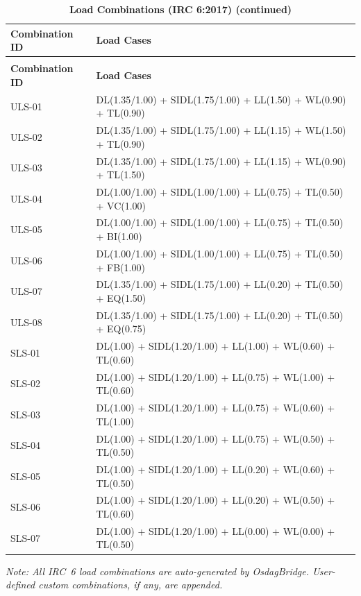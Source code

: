 \documentclass[12pt,a4paper]{report}
\numberwithin{table}{chapter}
\numberwithin{figure}{chapter}
\begin{document}
\vspace{1em}
\begin{longtable}{|C{4.0cm}|p{11.5cm}|}
\caption{\textbf{Load Combinations (IRC 6:2017)}}\\
\hline
\textbf{Combination ID} & \textbf{Load Cases} \\[6pt]
\hline
\endfirsthead
\caption[]{\textbf{Load Combinations (IRC 6:2017) (continued)}}\\
\hline
\textbf{Combination ID} & \textbf{Load Cases} \\[6pt]
\hline
\endhead
\hline
\endfoot
\endlastfoot
ULS-01 & DL(1.35/1.00) + SIDL(1.75/1.00) + LL(1.50) + WL(0.90) + TL(0.90) \\[6pt]
\hline
ULS-02 & DL(1.35/1.00) + SIDL(1.75/1.00) + LL(1.15) + WL(1.50) + TL(0.90) \\[6pt]
\hline
ULS-03 & DL(1.35/1.00) + SIDL(1.75/1.00) + LL(1.15) + WL(0.90) + TL(1.50) \\[6pt]
\hline
ULS-04 & DL(1.00/1.00) + SIDL(1.00/1.00) + LL(0.75) + TL(0.50) + VC(1.00) \\[6pt]
\hline
ULS-05 & DL(1.00/1.00) + SIDL(1.00/1.00) + LL(0.75) + TL(0.50) + BI(1.00) \\[6pt]
\hline
ULS-06 & DL(1.00/1.00) + SIDL(1.00/1.00) + LL(0.75) + TL(0.50) + FB(1.00) \\[6pt]
\hline
ULS-07 & DL(1.35/1.00) + SIDL(1.75/1.00) + LL(0.20) + TL(0.50) + EQ(1.50) \\[6pt]
\hline
ULS-08 & DL(1.35/1.00) + SIDL(1.75/1.00) + LL(0.20) + TL(0.50) + EQ(0.75) \\[6pt]
\hline
SLS-01 & DL(1.00) + SIDL(1.20/1.00) + LL(1.00) + WL(0.60) + TL(0.60) \\[6pt]
\hline
SLS-02 & DL(1.00) + SIDL(1.20/1.00) + LL(0.75) + WL(1.00) + TL(0.60) \\[6pt]
\hline
SLS-03 & DL(1.00) + SIDL(1.20/1.00) + LL(0.75) + WL(0.60) + TL(1.00) \\[6pt]
\hline
SLS-04 & DL(1.00) + SIDL(1.20/1.00) + LL(0.75) + WL(0.50) + TL(0.50) \\[6pt]
\hline
SLS-05 & DL(1.00) + SIDL(1.20/1.00) + LL(0.20) + WL(0.60) + TL(0.50) \\[6pt]
\hline
SLS-06 & DL(1.00) + SIDL(1.20/1.00) + LL(0.20) + WL(0.50) + TL(0.60) \\[6pt]
\hline
SLS-07 & DL(1.00) + SIDL(1.20/1.00) + LL(0.00) + WL(0.00) + TL(0.50) \\[6pt]
\hline
\end{longtable}

\noindent\textit{Note: All IRC~6 load combinations are auto-generated by OsdagBridge. User-defined custom combinations, if any, are appended.}
\end{document}
